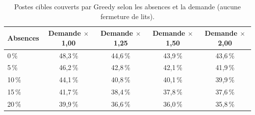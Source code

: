 \begin{table}[H]
    \centering
    \caption{Postes cibles couverts par Greedy selon les absences et la demande (aucune fermeture de lits).}
    \label{tab:sensibilite_couverture}
    \small
    \begin{tabular}{lcccc}
        \toprule
        \textbf{Absences} & \textbf{Demande $\times$1{,}00} & \textbf{Demande $\times$1{,}25} & \textbf{Demande $\times$1{,}50} & \textbf{Demande $\times$2{,}00} \\
        \midrule
        0\,\% & 48{,}3\,\% & 44{,}6\,\% & 43{,}9\,\% & 43{,}6\,\% \\
        5\,\% & 46{,}2\,\% & 42{,}8\,\% & 42{,}1\,\% & 41{,}9\,\% \\
        10\,\% & 44{,}1\,\% & 40{,}8\,\% & 40{,}1\,\% & 39{,}9\,\% \\
        15\,\% & 41{,}7\,\% & 38{,}4\,\% & 37{,}8\,\% & 37{,}6\,\% \\
        20\,\% & 39{,}9\,\% & 36{,}6\,\% & 36{,}0\,\% & 35{,}8\,\% \\
        \bottomrule
    \end{tabular}
\end{table}
